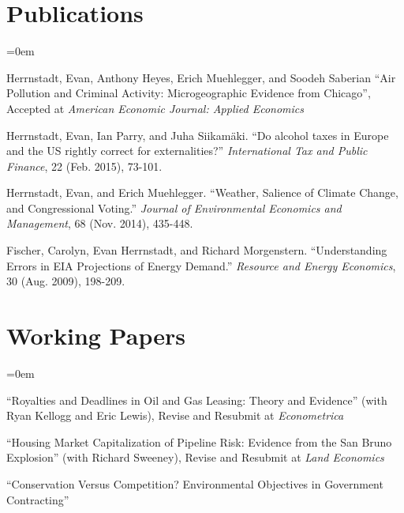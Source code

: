 \documentclass[letterpaper]{article}
\renewenvironment{itemize}{
  \vspace{-0.5em}
  \begin{list}{}{
	\itemsep=0em
    \setlength{\leftmargin}{1.5em}
  }
}{
  \end{list}
}
\begin{document}
\section*{Publications}

\begin{itemize}
\item Herrnstadt, Evan, Anthony Heyes, Erich Muehlegger, and Soodeh Saberian “Air Pollution and Criminal Activity: Microgeographic Evidence from Chicago”, Accepted at \emph{American Economic Journal: Applied Economics}

\item Herrnstadt, Evan, Ian Parry, and Juha Siikamäki. “Do alcohol taxes in Europe and the US rightly correct for externalities?” \textit{International Tax and Public Finance}, 22 (Feb. 2015), 73-101.

\item Herrnstadt, Evan, and Erich Muehlegger.  “Weather, Salience of Climate Change, and Congressional Voting.” \textit{Journal of Environmental Economics and Management}, 68 (Nov. 2014), 435-448.

\item Fischer, Carolyn, Evan Herrnstadt, and Richard Morgenstern. “Understanding Errors in EIA Projections of Energy Demand.”  \textit{Resource and Energy Economics}, 30 (Aug. 2009), 198-209.
\end{itemize}

\section*{Working Papers}

\begin{itemize}
\item “Royalties and Deadlines in Oil and Gas Leasing: Theory and Evidence” 
(with Ryan Kellogg and Eric Lewis), Revise and Resubmit at \emph{Econometrica}

\item “Housing Market Capitalization of Pipeline Risk: Evidence from the San Bruno Explosion”
(with Richard Sweeney), Revise and Resubmit at \emph{Land Economics}

\item “Conservation Versus Competition? Environmental Objectives in Government Contracting” 

\end{itemize}
\end{document}
